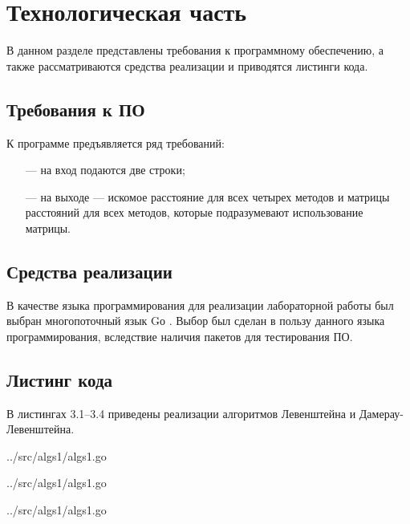 \chapter{Технологическая часть}

В данном разделе представлены требования к программному обеспечению, а также рассматриваются средства реализации и приводятся листинги кода.

\section{Требования к ПО}

К программе предъявляется ряд требований:
\begin{itemize}
	\item[---] на вход подаются две строки;
	\item[---] на выходе --- искомое расстояние для всех четырех методов и матрицы расстояний для всех методов, которые подразумевают использование матрицы.
\end{itemize}

\section{Средства реализации}

В качестве языка программирования для реализации лабораторной работы был выбран многопоточный язык Gо \cite{golang}. Выбор был сделан в пользу данного языка программирования, вследствие наличия пакетов для тестирования ПО.

\section{Листинг кода}

В листингах 3.1--3.4 приведены реализации алгоритмов Левенштейна и Дамерау-Левенштейна.
\newpage

\begin{lstinputlisting}[
	caption={Матричный (Левенштейн)},
	label={lst:levenshteinmat},
	style={go},
	linerange={41-57},
	]{../src/algs1/algs1.go}
\end{lstinputlisting}

\begin{lstinputlisting}[
	caption={Рекурсивный (Дамерау-Левенштейн)},
	label={lst:dlevenshteinrec},
	style={go},
	linerange={123-148},
	]{../src/algs1/algs1.go}
\end{lstinputlisting}

\begin{lstinputlisting}[
	caption={Матричный (Дамерау-Левенштейн)},
	label={lst:dlevenshteinmatr},
	style={go},
	linerange={59-80},
	]{../src/algs1/algs1.go}
\end{lstinputlisting}

